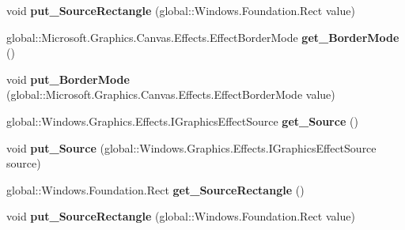 \begin{DoxyCompactItemize}
void {\bfseries put\+\_\+\+Source\+Rectangle} (global\+::\+Windows.\+Foundation.\+Rect value)
\item 
\mbox{\label{interface_microsoft_1_1_graphics_1_1_canvas_1_1_effects_1_1_i_crop_effect_aedc53db53d8d6e57c40517ab6a3758d0}} 
global\+::\+Microsoft.\+Graphics.\+Canvas.\+Effects.\+Effect\+Border\+Mode {\bfseries get\+\_\+\+Border\+Mode} ()
\item 
\mbox{\label{interface_microsoft_1_1_graphics_1_1_canvas_1_1_effects_1_1_i_crop_effect_ae88c621641cd9be11414409037414d5e}} 
void {\bfseries put\+\_\+\+Border\+Mode} (global\+::\+Microsoft.\+Graphics.\+Canvas.\+Effects.\+Effect\+Border\+Mode value)
\item 
\mbox{\label{interface_microsoft_1_1_graphics_1_1_canvas_1_1_effects_1_1_i_crop_effect_ae17d9daa0439d30e16235dde28fde47d}} 
global\+::\+Windows.\+Graphics.\+Effects.\+I\+Graphics\+Effect\+Source {\bfseries get\+\_\+\+Source} ()
\item 
\mbox{\label{interface_microsoft_1_1_graphics_1_1_canvas_1_1_effects_1_1_i_crop_effect_aad283c62ebd28ad1ba136787595806fa}} 
void {\bfseries put\+\_\+\+Source} (global\+::\+Windows.\+Graphics.\+Effects.\+I\+Graphics\+Effect\+Source source)
\item 
\mbox{\label{interface_microsoft_1_1_graphics_1_1_canvas_1_1_effects_1_1_i_crop_effect_afc0de3bee5f831a8dfac30ecac6a898d}} 
global\+::\+Windows.\+Foundation.\+Rect {\bfseries get\+\_\+\+Source\+Rectangle} ()
\item 
\mbox{\label{interface_microsoft_1_1_graphics_1_1_canvas_1_1_effects_1_1_i_crop_effect_ad88fede8cf2dfab050189939a47de349}} 
void {\bfseries put\+\_\+\+Source\+Rectangle} (global\+::\+Windows.\+Foundation.\+Rect value)
\item 
\mbox{\label{interface_microsoft_1_1_graphics_1_1_canvas_1_1_effects_1_1_i_crop_effect_aedc53db53d8d6e57c40517ab6a3758d0}} 

\end{DoxyCompactItemize}
